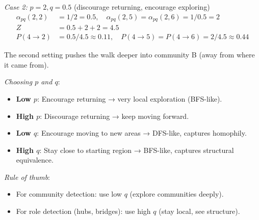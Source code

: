 \begin{notechapter}
\begin{example}
\emph{Case 2:} $p=2, q=0.5$ (discourage returning, encourage exploring)
\begin{align*}
\alpha_{pq}(2,2) &= 1/2 = 0.5, \quad \alpha_{pq}(2,5) = \alpha_{pq}(2,6) = 1/0.5 = 2 \\
Z &= 0.5 + 2 + 2 = 4.5 \\
P(4 \to 2) &= 0.5/4.5 \approx 0.11, \quad P(4 \to 5) = P(4 \to 6) = 2/4.5 \approx 0.44
\end{align*}

The second setting pushes the walk deeper into community B (away from where it came from).
\end{example}

\begin{keyidea}
\emph{Choosing $p$ and $q$}:
\begin{itemize}
    \item \textbf{Low $p$}: Encourage returning → very local exploration (BFS-like).
    \item \textbf{High $p$}: Discourage returning → keep moving forward.
    \item \textbf{Low $q$}: Encourage moving to new areas → DFS-like, captures homophily.
    \item \textbf{High $q$}: Stay close to starting region → BFS-like, captures structural equivalence.
\end{itemize}

\emph{Rule of thumb}:
\begin{itemize}
    \item For community detection: use low $q$ (explore communities deeply).
    \item For role detection (hubs, bridges): use high $q$ (stay local, see structure).
\end{itemize}
\end{keyidea}

\begin{figure}[htbp]
\centering
{}
\end{figure}
\end{notechapter}
